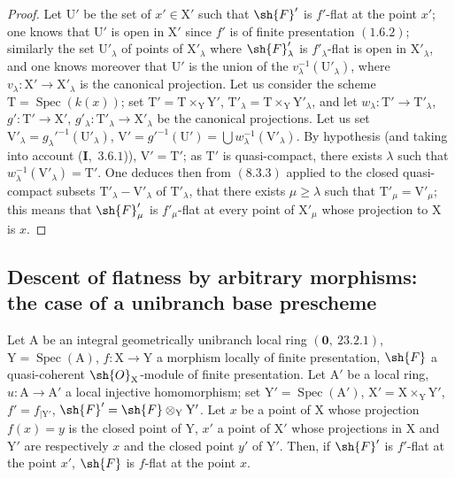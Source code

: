 \begin{proof}
Let $\mathrm{U}'$ be the set of $x'\in\mathrm{X}'$ such that $\sh{F}'$ is $f'$-flat at the point $x'$; one knows 
that $\mathrm{U}'$ is open in $\mathrm{X}'$ since $f'$ is of finite presentation $(1.6.2)$; similarly the
set $\mathrm{U}'_\lambda$ of points of $\mathrm{X}'_\lambda$ where $\sh{F}'_\lambda$ is $f'_\lambda$-flat is open in $\mathrm{X}'_\lambda$, and one knows moreover
 that $\mathrm{U}'$ is the union of the $v_\lambda^{-1}(\mathrm{U}'_\lambda)$, where $v_\lambda:\mathrm{X}'\to\mathrm{X}'_\lambda$ is the canonical projection.
Let us consider the scheme $\mathrm{T}=\operatorname{Spec}(k(x))$; set $\mathrm{T}'=\mathrm{T}\times_\mathrm{Y}\mathrm{Y}'$, $\mathrm{T}'_\lambda=\mathrm{T}\times_\mathrm{Y}\mathrm{Y}'_\lambda$, and let
$w_\lambda:\mathrm{T}'\to\mathrm{T}'_\lambda$, $g':\mathrm{T}'\to\mathrm{X}'$, $g'_\lambda:\mathrm{T}'_\lambda\to\mathrm{X}'_\lambda$ be the canonical projections. Let us set $\mathrm{V}'_\lambda=g_\lambda'^{-1}(\mathrm{U}'_\lambda)$,
$\mathrm{V}'=g'^{-1}(\mathrm{U}')=\bigcup w_\lambda^{-1}(\mathrm{V}'_\lambda)$. By hypothesis (and taking into account (\textbf{I},~$3.6.1$)), $\mathrm{V}'=\mathrm{T}'$;
as $\mathrm{T}'$ is quasi-compact, there exists $\lambda$ such that $w_\lambda^{-1}(\mathrm{V}'_\lambda)=\mathrm{T}'$. One deduces then from $(8.3.3)$
applied to the closed quasi-compact subsets $\mathrm{T}'_\lambda-\mathrm{V}'_\lambda$ of $\mathrm{T}'_\lambda$, that there exists $\mu\geq\lambda$ such
that $\mathrm{T}'_\mu=\mathrm{V}'_\mu$; this means that $\sh{F}'_\mu$ is $f'_\mu$-flat at every point of $\mathrm{X}'_\mu$ whose projection
to $\mathrm{X}$ is $x$.
\end{proof}

\subsection{Descent of flatness by arbitrary morphisms: the case of a unibranch base prescheme}
\label{subsection:IV.11.6}

\begin{theorem}[11.6.1]
\label{IV.11.6.1}
Let $\mathrm{A}$ be an integral geometrically unibranch local ring
$(\mathbf{0},~23.2.1)$, $\mathrm{Y}=\operatorname{Spec}(\mathrm{A})$, $f:\mathrm{X}\to\mathrm{Y}$ a morphism locally of finite presentation, $\sh{F}$ a
quasi-coherent $\sh{O}_\mathrm{X}$-module of finite presentation. Let $\mathrm{A}'$ be a local ring, $u:\mathrm{A}\to\mathrm{A}'$ a local
injective homomorphism; set $\mathrm{Y}'=\operatorname{Spec}(\mathrm{A}')$, $\mathrm{X}'=\mathrm{X}\times_\mathrm{Y}\mathrm{Y}'$, $f'=f_{|\mathrm{Y}'}$, $\sh{F}'=\sh{F}\otimes_\mathrm{Y}\mathrm{Y}'$. Let $x$ be
a point of $\mathrm{X}$ whose projection $f(x)=y$ is the closed point of $\mathrm{Y}$, $x'$ a point of $\mathrm{X}'$ whose projections
in $\mathrm{X}$ and $\mathrm{Y}'$ are respectively $x$ and the closed point $y'$ of $\mathrm{Y}'$. Then, if $\sh{F}'$ is $f'$-flat at the point $x'$,
$\sh{F}$ is $f$-flat at the point $x$.
\end{theorem}

